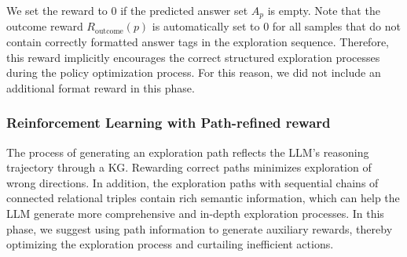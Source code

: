 We set the reward to 0 if the predicted answer set $A_p$ is empty.
Note that the outcome reward $R_{\textrm{outcome}}(p)$ is automatically set to 0 for all samples that do not contain correctly formatted answer tags in the exploration sequence.
Therefore, this reward implicitly encourages the correct structured exploration processes during the policy optimization process. For this reason, we did not include an additional format reward in this phase.

\subsubsection{ Reinforcement Learning with Path-refined reward}\label{subsubsec:pathreward}
The process of generating an exploration path reflects the LLM's reasoning trajectory through a KG.
Rewarding correct paths minimizes exploration of wrong directions. 
In addition, 
the exploration paths with sequential chains of connected relational triples contain rich semantic information, 
which can help the LLM generate more comprehensive and in-depth exploration processes.
In this phase, we suggest using path information to generate auxiliary rewards, thereby optimizing the exploration process and curtailing inefficient actions.

